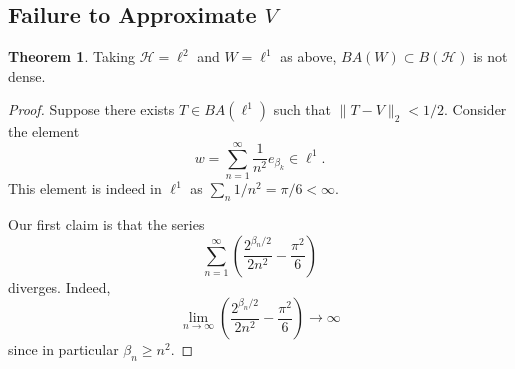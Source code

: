 \documentclass{dcthesis}
\numberwithin{equation}{section}
\numberwithin{equation}{section}
\theoremstyle{definition}
\newtheorem{theorem}[equation]{Theorem}
\begin{document}
\subsection{Failure to Approximate $V$} %

\begin{theorem}
	Taking $\mathcal{H}=\ell^2$ and $W=\ell^1$ as above, $BA(W)\subset B(\mathcal{H})$ is not dense.
\end{theorem}
\begin{proof}
	Suppose there exists $T\in BA(\ell^1)$ such that $\|T-V\|_2<1/2$. Consider the element 
	\[
		w=\sum_{n=1}^\infty\frac{1}{n^2}e_{\beta_k}\in\ell^1.
	\]
	This element is indeed in $\ell^1$ as $\sum_n 1/n^2=\pi/6<\infty$. 

	Our first claim is that the series
	\[
		\sum_{n=1}^\infty \left(\frac{2^{\beta_n/2}}{2n^2} -\frac{\pi^2}{6}\right)
	\]
	diverges. Indeed, 
	\begin{equation*}
		\lim_{n\to\infty} \left(\frac{2^{\beta_n/2}}{2n^2} -\frac{\pi^2}{6}\right)\to\infty
	\end{equation*}
	since in particular $\beta_n\geq n^2$.


\end{proof}
\end{document}
